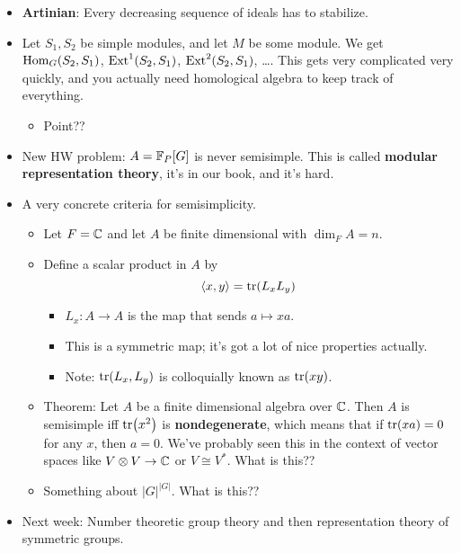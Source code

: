 \documentclass[../notes.tex]{subfiles}
\begin{document}
\begin{itemize}
\begin{proof}
        \begin{equation*}
            \ker(f) = \bigcap_{i=1}^nL_i = \Rad(A) = (0)
        \end{equation*}
        But then $f$ is injective, so ${}_AA$ is a submodule of a semisimple module, so therefore ${}_AA$ is semisimple itself. Help on this whole direction of the argument??
    \end{proof}
    \item \textbf{Artinian}: Every decreasing sequence of ideals has to stabilize.
    \item Let $S_1,S_2$ be simple modules, and let $M$ be some module. We get $\operatorname{Hom}_G(S_2,S_1)$, $\operatorname{Ext}^1(S_2,S_1)$, $\operatorname{Ext}^2(S_2,S_1)$, \dots. This gets very complicated very quickly, and you actually need homological algebra to keep track of everything.
    \begin{itemize}
        \item Point??
    \end{itemize}
    \item New HW problem: $A=\mathbb{F}_P[G]$ is never semisimple. This is called \textbf{modular representation theory}, it's in our book, and it's hard.
    \item A very concrete criteria for semisimplicity.
    \begin{itemize}
        \item Let $F=\mathbb{C}$ and let $A$ be finite dimensional with $\dim_FA=n$.
        \item Define a scalar product in $A$ by
        \begin{equation*}
            \left\langle{x,y}\right\rangle = \tr(L_xL_y)
        \end{equation*}
        \begin{itemize}
            \item $L_x:A\to A$ is the map that sends $a\mapsto xa$.
            \item This is a symmetric map; it's got a lot of nice properties actually.
            \item Note: $\tr(L_x,L_y)$ is colloquially known as $\tr(xy)$.
        \end{itemize}
        \item Theorem: Let $A$ be a finite dimensional algebra over $\mathbb{C}$. Then $A$ is semisimple iff $\tr(x^2)$ is \textbf{nondegenerate}, which means that if $\tr(xa)=0$ for any $x$, then $a=0$. We've probably seen this in the context of vector spaces like $V\otimes V\to\mathbb{C}$ or $V\cong V^*$. What is this??
        \item Something about $|G|^{|G|}$. What is this??
    \end{itemize}
    \item Next week: Number theoretic group theory and then representation theory of symmetric groups.
\end{itemize}
\end{document}
